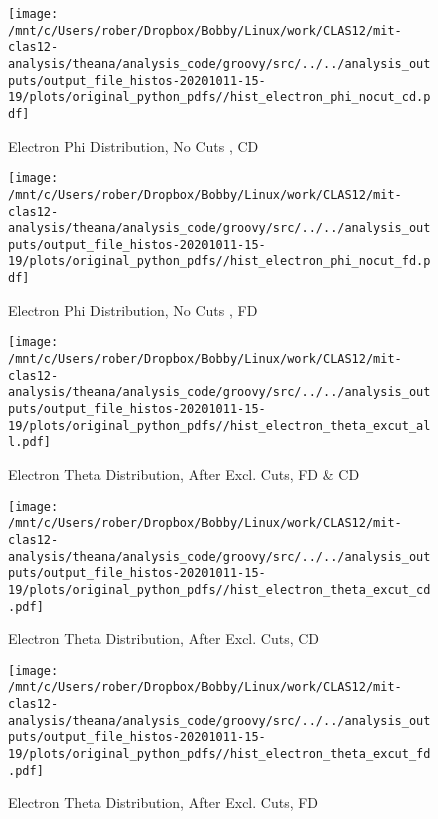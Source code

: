 \documentclass{article}
\begin{document}
\begin{landscape}
\begin{figure}[h]
        \texttt{[image: /mnt/c/Users/rober/Dropbox/Bobby/Linux/work/CLAS12/mit-clas12-analysis/theana/analysis\_code/groovy/src/../../analysis\_outputs/output\_file\_histos-20201011-15-19/plots/original\_python\_pdfs//hist\_electron\_phi\_nocut\_cd.pdf]}
        \captionsetup{textformat=empty,labelformat=blank}
        \caption{Electron Phi Distribution, No Cuts , CD}
    \end{figure}
    \clearpage
    
    \begin{figure}[h]
        \centering

        \texttt{[image: /mnt/c/Users/rober/Dropbox/Bobby/Linux/work/CLAS12/mit-clas12-analysis/theana/analysis\_code/groovy/src/../../analysis\_outputs/output\_file\_histos-20201011-15-19/plots/original\_python\_pdfs//hist\_electron\_phi\_nocut\_fd.pdf]}
        \captionsetup{textformat=empty,labelformat=blank}
        \caption{Electron Phi Distribution, No Cuts , FD}
    \end{figure}
    \clearpage
    
    \begin{figure}[h]
        \centering

        \texttt{[image: /mnt/c/Users/rober/Dropbox/Bobby/Linux/work/CLAS12/mit-clas12-analysis/theana/analysis\_code/groovy/src/../../analysis\_outputs/output\_file\_histos-20201011-15-19/plots/original\_python\_pdfs//hist\_electron\_theta\_excut\_all.pdf]}
        \captionsetup{textformat=empty,labelformat=blank}
        \caption{Electron Theta Distribution, After Excl. Cuts, FD \& CD}
    \end{figure}
    \clearpage
    
    \begin{figure}[h]
        \centering

        \texttt{[image: /mnt/c/Users/rober/Dropbox/Bobby/Linux/work/CLAS12/mit-clas12-analysis/theana/analysis\_code/groovy/src/../../analysis\_outputs/output\_file\_histos-20201011-15-19/plots/original\_python\_pdfs//hist\_electron\_theta\_excut\_cd.pdf]}
        \captionsetup{textformat=empty,labelformat=blank}
        \caption{Electron Theta Distribution, After Excl. Cuts, CD}
    \end{figure}
    \clearpage
    
    \begin{figure}[h]
        \centering

        \texttt{[image: /mnt/c/Users/rober/Dropbox/Bobby/Linux/work/CLAS12/mit-clas12-analysis/theana/analysis\_code/groovy/src/../../analysis\_outputs/output\_file\_histos-20201011-15-19/plots/original\_python\_pdfs//hist\_electron\_theta\_excut\_fd.pdf]}
        \captionsetup{textformat=empty,labelformat=blank}
        \caption{Electron Theta Distribution, After Excl. Cuts, FD}
    \end{figure}
    \clearpage
    

\end{landscape}
\end{document}
